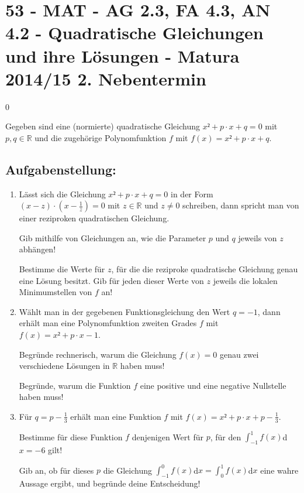 \section{53 - MAT - AG 2.3, FA 4.3, AN 4.2 - Quadratische Gleichungen und ihre Lösungen - Matura 2014/15 2. Nebentermin}

\begin{langesbeispiel} \item[0] %
				
	Gegeben sind eine (normierte) quadratische Gleichung $x²+p\cdot x+q=0$ mit $p,q\in\mathbb{R}$ und die zugehörige Polynomfunktion $f$ mit $f(x)=x²+p\cdot x+q$.

\subsection{Aufgabenstellung:}
\begin{enumerate}
	\item Lässt sich die Gleichung $x²+p\cdot x+q=0$ in der Form $\left(x-z\right)\cdot\left(x-\frac{1}{z}\right)=0$ mit $z\in\mathbb{R}$ und $z\neq 0$ schreiben, dann spricht man von einer reziproken quadratischen Gleichung.\leer
	
	Gib mithilfe von Gleichungen an, wie die Parameter $p$ und $q$ jeweils von $z$ abhängen!\leer
	
	Bestimme die Werte für $z$, für die die reziproke quadratische Gleichung genau eine Lösung besitzt. Gib für jeden dieser Werte von $z$ jeweils die lokalen Minimumstellen von $f$ an!\leer
	
\item Wählt man in der gegebenen Funktionsgleichung den Wert $q=-1$, dann erhält man eine Polynomfunktion zweiten Grades $f$ mit $f(x)=x²+p\cdot x-1$.\leer

 Begründe rechnerisch, warum die Gleichung $f(x)=0$ genau zwei verschiedene Lösungen in $\mathbb{R}$ haben muss!\leer

Begründe, warum die Funktion $f$ eine positive und eine negative Nullstelle haben muss!\leer

\item Für $q=p-\frac{1}{3}$ erhält man eine Funktion $f$ mit $f(x)=x²+p\cdot x+p-\frac{1}{3}$.\leer

Bestimme für diese Funktion $f$ denjenigen Wert für $p$, für den $\int^{1}_{-1}{f(x)}$d$x=-6$ gilt!\leer

Gib an, ob für dieses $p$ die Gleichung $\int^0_{-1}{f(x)}$d$x=\int^1_0{f(x)}$d$x$ eine wahre Aussage ergibt, und begründe deine Entscheidung!
						\end{enumerate}\leer
				

\end{langesbeispiel}
